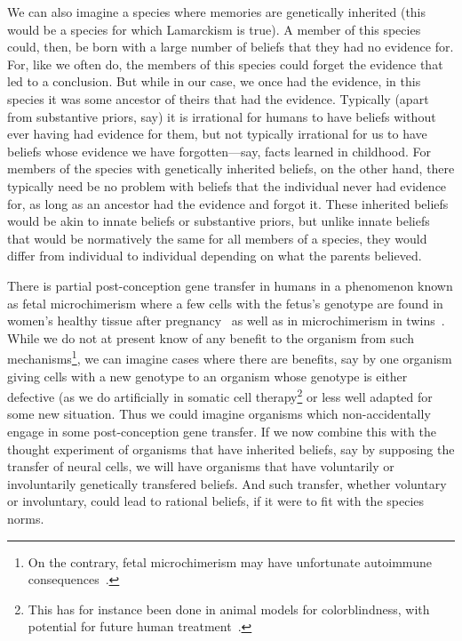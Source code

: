 We can also imagine a species where memories are genetically inherited (this would be a species for which
Lamarckism is true). A member of this species could, then, be born with a 
large number of beliefs that they had no evidence for. For, like we often do, the members of this species could forget the
evidence that led to a conclusion. But while in our case, we once had the evidence, in this species it was some ancestor
of theirs that had the evidence. Typically (apart from substantive priors, say) it is irrational for humans to have beliefs without ever having had evidence for them, but not typically irrational for us to have beliefs whose evidence
we have forgotten---say, facts learned in childhood. For members of the species with genetically inherited beliefs, on the other hand, there typically need be no problem with beliefs that the individual never had evidence for, as long as an ancestor had the evidence and forgot it. These inherited beliefs would be akin to innate beliefs or substantive priors, but unlike innate beliefs that would be normatively the same for all members of a species, they would differ from individual to individual
depending on what the parents believed. 

There is partial post-conception gene transfer in humans in a phenomenon known as fetal microchimerism where a few
cells with the fetus's genotype are found in women's healthy tissue after 
pregnancy~\parencite{ODonoghueMicrochimerism} as well as in microchimerism in twins~\parencite{WaszakTwins}. 
While we do not at present know of any benefit to the organism from such mechanisms\footnote{On the contrary,
fetal microchimerism may have unfortunate autoimmune consequences~\parencite{ODonoghueMicrochimerism}.}, we can imagine cases where
there are benefits, say by one organism giving cells with a new genotype to an organism whose genotype is either
defective (as we do artificially in somatic cell therapy\footnote{This has for instance been done in animal models
for colorblindness, with potential for future human treatment~\parencite{HassallColorblindness}.} or less well
adapted for some new situation. Thus we could imagine organisms which non-accidentally engage in some post-conception gene transfer. If we now combine
this with the thought experiment of organisms that have inherited beliefs, say by supposing the transfer of neural
cells, we will have organisms that have voluntarily or involuntarily genetically transfered beliefs. And such 
transfer, whether voluntary or involuntary, could lead to rational beliefs, if it were to fit with the 
species norms.


